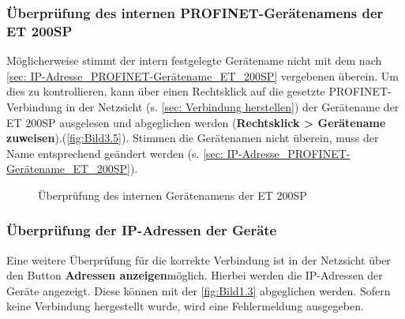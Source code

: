 \subsubsection{Überprüfung des internen PROFINET-Gerätenamens der ET 200SP}
Möglicherweise stimmt der intern festgelegte Gerätename nicht mit dem nach \autoref{sec: IP-Adresse_PROFINET-Gerätename_ET_200SP} vergebenen überein. Um dies zu kontrollieren, kann über einen Rechtsklick auf die gesetzte PROFINET-Verbindung in der Netzsicht (s. \autoref{sec: Verbindung herstellen}) der Gerätename der ET 200SP ausgelesen und abgeglichen werden (\textbf{Rechtsklick > Gerätename zuweisen}).(\autoref{fig:Bild3.5}).  Stimmen die Gerätenamen nicht überein, muss der Name entsprechend geändert werden (s. \autoref{sec: IP-Adresse_PROFINET-Gerätename_ET_200SP}).

\begin{figure}[H]
   \centering
   \caption[Überprüfung des internen Gerätenamens der ET 200SP]{Überprüfung des internen Gerätenamens der ET 200SP}
   \label{fig:Bild5.3}
\end{figure}

\subsubsection{Überprüfung der IP-Adressen der Geräte}
Eine weitere Überprüfung für die korrekte Verbindung ist in der Netzsicht über den Button \glqq\textbf{Adressen anzeigen}\grqq\:möglich. Hierbei werden die IP-Adressen der Geräte angezeigt. Diese können mit der \autoref{fig:Bild1.3} abgeglichen werden. Sofern keine Verbindung hergestellt wurde, wird eine Fehlermeldung ausgegeben.


